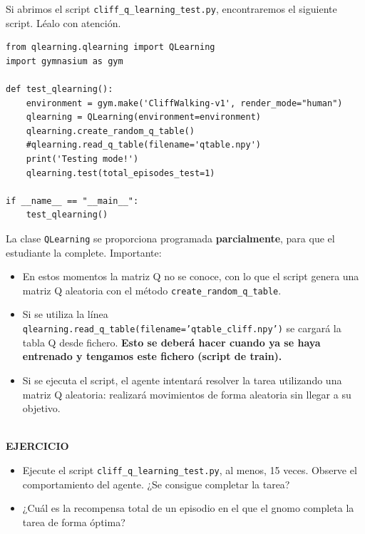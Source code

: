 \documentclass{article}
\begin{document}
\begin{exercise}
Si abrimos el script \texttt{cliff\_q\_learning\_test.py}, encontraremos el siguiente script. Léalo con atención. 

\begin{verbatim}
from qlearning.qlearning import QLearning
import gymnasium as gym

def test_qlearning():
    environment = gym.make('CliffWalking-v1', render_mode="human")
    qlearning = QLearning(environment=environment)
    qlearning.create_random_q_table() 
    #qlearning.read_q_table(filename='qtable.npy')
    print('Testing mode!')
    qlearning.test(total_episodes_test=1)

if __name__ == "__main__":
    test_qlearning()
\end{verbatim}



La clase \texttt{QLearning} se proporciona programada \textbf{parcialmente}, para que el estudiante la complete. Importante:
\begin{itemize}
    \item En estos momentos la matriz Q no se conoce, con lo que el script genera una matriz Q aleatoria con el método \texttt{create\_random\_q\_table}.
    \item Si se utiliza la línea \texttt{qlearning.read\_q\_table(filename='qtable\_cliff.npy')} se cargará la tabla Q desde fichero. \textbf{Esto se deberá hacer cuando ya se haya entrenado y tengamos este fichero (script de train).}
    \item Si se ejecuta el script, el agente intentará resolver la tarea utilizando una matriz Q aleatoria: realizará movimientos de forma aleatoria sin llegar a su objetivo.
\end{itemize}\\
\textbf{EJERCICIO}\\
\begin{itemize}
    \item Ejecute el script \texttt{cliff\_q\_learning\_test.py}, al menos, 15 veces. Observe el comportamiento del agente. ¿Se consigue completar la tarea?    
    \item  ¿Cuál es la recompensa total de un episodio en el que el gnomo completa la tarea de forma óptima?
\end{itemize}

\end{exercise}


\end{document}
